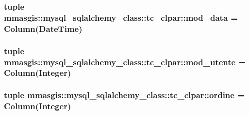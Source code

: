 \label{classmmasgis_1_1mysql__sqlalchemy__class_1_1tc__clpar_ab0131f0424504026879fd4e2bdef1348}
\hypertarget{classmmasgis_1_1mysql__sqlalchemy__class_1_1tc__clpar_ab89f13f40d6c877f156ccaeeed43288a}{
\subsubsection[{mod\_\-data}]{\setlength{\rightskip}{0pt plus 5cm}tuple {\bf mmasgis::mysql\_\-sqlalchemy\_\-class::tc\_\-clpar::mod\_\-data} = Column(DateTime)}}
\label{classmmasgis_1_1mysql__sqlalchemy__class_1_1tc__clpar_ab89f13f40d6c877f156ccaeeed43288a}
\hypertarget{classmmasgis_1_1mysql__sqlalchemy__class_1_1tc__clpar_afe5b19087a7455aa17e21cdacbca1859}{
\subsubsection[{mod\_\-utente}]{\setlength{\rightskip}{0pt plus 5cm}tuple {\bf mmasgis::mysql\_\-sqlalchemy\_\-class::tc\_\-clpar::mod\_\-utente} = Column(Integer)}}
\label{classmmasgis_1_1mysql__sqlalchemy__class_1_1tc__clpar_afe5b19087a7455aa17e21cdacbca1859}
\hypertarget{classmmasgis_1_1mysql__sqlalchemy__class_1_1tc__clpar_ade55911b6c8ae5145047c0a9e77a8abb}{
\subsubsection[{ordine}]{\setlength{\rightskip}{0pt plus 5cm}tuple {\bf mmasgis::mysql\_\-sqlalchemy\_\-class::tc\_\-clpar::ordine} = Column(Integer)}}
